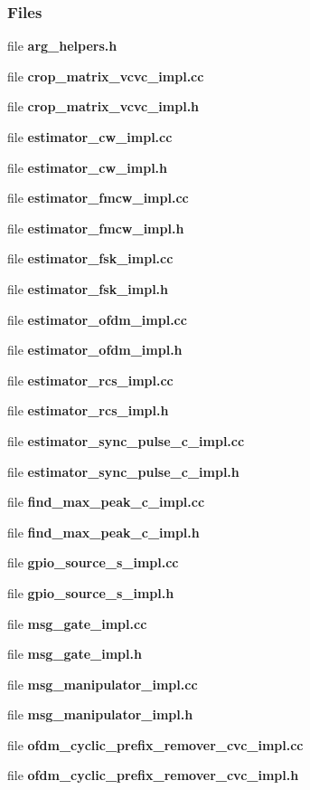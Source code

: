 \subsubsection*{Files}
\begin{DoxyCompactItemize}
\item 
file {\bf arg\+\_\+helpers.\+h}
\item 
file {\bf crop\+\_\+matrix\+\_\+vcvc\+\_\+impl.\+cc}
\item 
file {\bf crop\+\_\+matrix\+\_\+vcvc\+\_\+impl.\+h}
\item 
file {\bf estimator\+\_\+cw\+\_\+impl.\+cc}
\item 
file {\bf estimator\+\_\+cw\+\_\+impl.\+h}
\item 
file {\bf estimator\+\_\+fmcw\+\_\+impl.\+cc}
\item 
file {\bf estimator\+\_\+fmcw\+\_\+impl.\+h}
\item 
file {\bf estimator\+\_\+fsk\+\_\+impl.\+cc}
\item 
file {\bf estimator\+\_\+fsk\+\_\+impl.\+h}
\item 
file {\bf estimator\+\_\+ofdm\+\_\+impl.\+cc}
\item 
file {\bf estimator\+\_\+ofdm\+\_\+impl.\+h}
\item 
file {\bf estimator\+\_\+rcs\+\_\+impl.\+cc}
\item 
file {\bf estimator\+\_\+rcs\+\_\+impl.\+h}
\item 
file {\bf estimator\+\_\+sync\+\_\+pulse\+\_\+c\+\_\+impl.\+cc}
\item 
file {\bf estimator\+\_\+sync\+\_\+pulse\+\_\+c\+\_\+impl.\+h}
\item 
file {\bf find\+\_\+max\+\_\+peak\+\_\+c\+\_\+impl.\+cc}
\item 
file {\bf find\+\_\+max\+\_\+peak\+\_\+c\+\_\+impl.\+h}
\item 
file {\bf gpio\+\_\+source\+\_\+s\+\_\+impl.\+cc}
\item 
file {\bf gpio\+\_\+source\+\_\+s\+\_\+impl.\+h}
\item 
file {\bf msg\+\_\+gate\+\_\+impl.\+cc}
\item 
file {\bf msg\+\_\+gate\+\_\+impl.\+h}
\item 
file {\bf msg\+\_\+manipulator\+\_\+impl.\+cc}
\item 
file {\bf msg\+\_\+manipulator\+\_\+impl.\+h}
\item 
file {\bf ofdm\+\_\+cyclic\+\_\+prefix\+\_\+remover\+\_\+cvc\+\_\+impl.\+cc}
\item 
file {\bf ofdm\+\_\+cyclic\+\_\+prefix\+\_\+remover\+\_\+cvc\+\_\+impl.\+h}

\end{DoxyCompactItemize}
